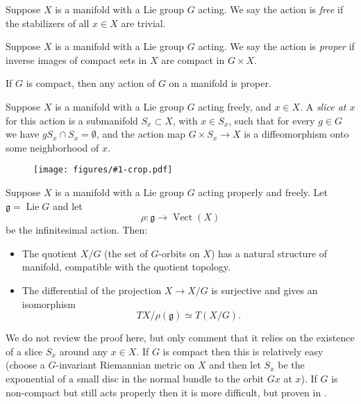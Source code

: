 \documentclass[12pt,letterpaper,reqno]{article}
\numberwithin{equation}{section}
\newcommand{\fg}{{\mathfrak g}}
\newcommand{\ti}[1]{\textit{#1}}
\DeclareMathOperator{\Lie}{Lie}
\DeclareMathOperator{\Vect}{Vect}
\newcommand{\insfig}[2]{\begin{figure}[htbp] \centering \texttt{[image: figures/\#1-crop.pdf]} \label{fig:#1} \end{figure}}
\begin{document}
\begin{defn} \label{def:free} Suppose $X$ is a manifold 
with a Lie group $G$ acting. We say the action is \ti{free} if 
the stabilizers of all $x \in X$ are trivial.
\end{defn}

\begin{defn} \label{def:proper}
Suppose $X$ is a manifold 
with a Lie group $G$ acting. We say the action is \ti{proper} if 
inverse images of compact sets in $X$
are compact in $G \times X$.
\end{defn}

\begin{prop}
If $G$ is compact, then any action of $G$ on a manifold is proper.
\end{prop}

\begin{defn}[Slice] \label{def:slice}
Suppose $X$ is a manifold with a Lie group $G$ acting freely, 
and $x \in X$.
A \ti{slice at $x$} for this action is a
submanifold $S_x \subset X$, with $x \in S_x$, 
such that for every $g \in G$ we have $g S_x \cap S_x = \emptyset$,
and the action map $G \times S_x \to X$ is a diffeomorphism
onto some neighborhood of $x$.
\end{defn}

\insfig{higgs-bundles-10}{1.1}

\begin{prop} \label{prop:free-proper-quotients-are-manifolds}
Suppose $X$ is a manifold with a Lie group $G$
acting properly and freely.
Let $\fg = \Lie G$ and let
\begin{equation}
\rho: \fg \to \Vect(X)  
\end{equation}
be the infinitesimal action.
Then:
\begin{itemize}
\item The quotient $X / G$ (the set of $G$-orbits on $X$) 
has a natural structure of manifold, compatible with
the quotient topology.
\item The differential of the projection $X \to X/G$ 
is surjective and gives an isomorphism
\begin{equation}
TX / \rho(\fg) \simeq T(X/G).
\end{equation}
\end{itemize}
\end{prop}

We do not review the proof here, but only comment that it 
relies on the existence of a slice $S_x$ around any $x \in X$.
If $G$ is compact then this is relatively easy (choose a 
$G$-invariant Riemannian metric on $X$ and then
let $S_x$ be the exponential of a small disc in the normal bundle
to the orbit $Gx$ at $x$). If $G$ is non-compact but still acts properly
then it is more difficult, but proven in \cite{MR0126506}.
\end{document}
